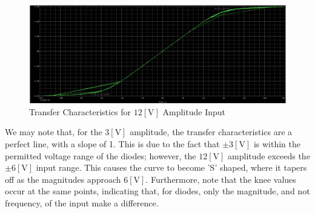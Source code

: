\begin{enumerate}
    \begin{figure}[H]
      \centering
      \includegraphics[width=.85\textwidth]{Figures/HW4-5e}
      \caption{Transfer Characteristics for $12[\si{\volt}]$ Amplitude Input}
      \label{fig:15}
    \end{figure}

    We may note that, for the $3[\si{\volt}]$ amplitude, the transfer characteristics are a perfect line, with a slope of 1. This is due to the fact that $\pm3[\si{\volt}]$ is within the permitted voltage range of the diodes; however, the $12[\si{\volt}]$ amplitude exceeds the $\pm6[\si{\volt}]$ input range. This causes the curve to become 'S' shaped, where it tapers off as the magnitudes approach $6[\si{\volt}]$. Furthermore, note that the knee values occur at the same points, indicating that, for diodes, only the magnitude, and not frequency, of the input make a difference.

\end{enumerate}



